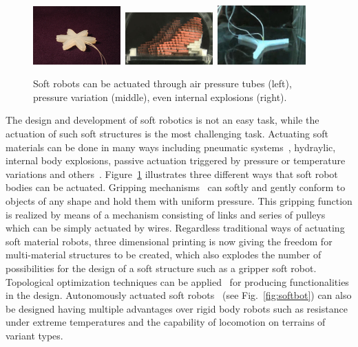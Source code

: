 \begin{figure}[t!]
\centering
\includegraphics[width=0.3\textwidth,height=0.13\textheight]{../Figures/Misc/soft_robotics_figure.png}\		
\includegraphics[width=0.3\textwidth,height=0.13\textheight]{../Figures/Misc/hillerPressureChamber.png}\	
\includegraphics[width=0.3\textwidth,height=0.13\textheight]{../Figures/Misc/ExplodingRobot.jpg}\\
\caption{Soft robots can be actuated through air pressure tubes (left), pressure variation (middle), even internal explosions (right).}
\label{fig:softRobotsActuation}
\end{figure}

The design and development of soft robotics is not an easy task, while the actuation of such soft structures is the most challenging task. Actuating soft materials can be done in many ways including pneumatic systems~\citep{ilievski2011soft, shepherd2011multigait}, hydraylic, internal body explosions, passive actuation triggered by pressure or temperature variations and others~\citep{laschi2012soft, seok2010peristaltic}. Figure~\ref{fig:softRobotsActuation} illustrates three different ways that soft robot bodies can be actuated. Gripping mechanisms~\citep{hirose1978development} can softly and gently conform to objects of any shape and hold them with uniform pressure. This gripping function is realized by means of a mechanism consisting of links and series of pulleys which can be simply actuated by wires. Regardless traditional ways of actuating soft material robots, three dimensional printing is now giving the freedom for multi-material structures to be created, which also explodes the number of possibilities for the design of a soft structure such as a gripper soft robot. Topological optimization techniques can be applied~\citep{hiller2009multi} for producing functionalities in the design. Autonomously actuated soft robots~\citep{tolleyresilient} (see Fig.~\ref{fig:softbot}) can also be designed having multiple advantages over rigid body robots such as resistance under extreme temperatures and the capability of locomotion on terrains of variant types. 

